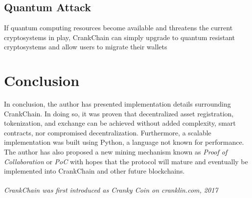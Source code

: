 \documentclass[10pt,twocolumn]{article}
\begin{document}
\subsection{Quantum Attack}
If quantum computing resources become available and threatens the current cryptosystems in play, CrankChain can simply upgrade to quantum resistant cryptosystems and allow users to migrate their wallets


\section{Conclusion}
In conclusion, the author has presented implementation details surrounding CrankChain.  In doing so, it was proven that decentralized asset registration, tokenization, and exchange can be achieved without added complexity, smart contracts, nor compromised decentralization.  Furthermore, a scalable implementation was built using Python, a language not known for performance.  \\
The author has also proposed a new mining mechanism known as \textit{Proof of Collaboration} or \textit{PoC} with hopes that the protocol will mature and eventually be implemented into CrankChain and other future blockchains.\\\\
\textit{CrankChain was first introduced as Cranky Coin on cranklin.com, 2017}\cite{website:cranklincrankycoin}
\clearpage


\end{document}

